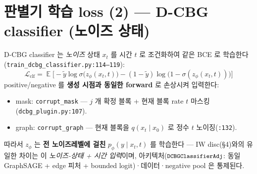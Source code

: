 \documentclass[11pt]{article}
\newcommand{\code}[1]{\texttt{\small #1}}
\newcommand{\xz}{x_0}
\newcommand{\xt}{x_t}
\DeclareMathOperator*{\E}{\mathbb{E}}
\theoremstyle{definition}
\begin{document}
\section{판별기 학습 loss (2) — D-CBG classifier (노이즈 상태)}
D-CBG classifier 는 \emph{노이즈} 상태 $\xt$ 를 시간 $t$ 로 조건화하여 같은 BCE 로 학습한다
(\code{train\_dcbg\_classifier.py:114--119}):
\begin{equation}
\boxed{\;\mathcal L_{\text{clf}}=\E\big[-\tilde y\log\sigma\big(z_\phi(\xt,t)\big)-(1-\tilde y)\log\big(1-\sigma(z_\phi(\xt,t))\big)\big]\;}
\end{equation}
positive/negative 를 \textbf{생성 시점과 동일한 forward} 로 손상시켜 입력한다:
\begin{itemize}[nosep,leftmargin=1.4em]
  \item mask: \code{corrupt\_mask} — $j$ 개 확정 블록 + 현재 블록 rate $t$ 마스킹(\code{dcbg\_plugin.py:107}).
  \item graph: \code{corrupt\_graph} — 현재 블록을 $q(\xt\mid\xz)$ 로 정수 $t$ 노이징(\code{:132}).
\end{itemize}
따라서 $z_\phi$ 는 \textbf{전 노이즈레벨에 걸친} $p_\phi(y\mid \xt,t)$ 를 학습한다 — IW disc(§4)와의
유일한 차이는 이 \emph{노이즈-상태 + 시간 입력}이며, 아키텍처($\code{DCBGClassifierAdj}$: 동일 GraphSAGE
+ edge 피처 + bounded logit)·데이터·negative pool 은 통제된다.

\end{document}
